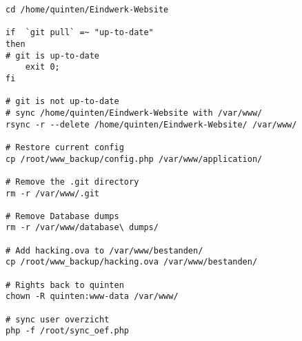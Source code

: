 \begin{lstlisting}
cd /home/quinten/Eindwerk-Website
    
if  `git pull` =~ "up-to-date" 
then
# git is up-to-date
	exit 0;
fi
    
# git is not up-to-date
# sync /home/quinten/Eindwerk-Website with /var/www/
rsync -r --delete /home/quinten/Eindwerk-Website/ /var/www/
    
# Restore current config
cp /root/www_backup/config.php /var/www/application/
    
# Remove the .git directory
rm -r /var/www/.git
    
# Remove Database dumps
rm -r /var/www/database\ dumps/
    
# Add hacking.ova to /var/www/bestanden/
cp /root/www_backup/hacking.ova /var/www/bestanden/
    
# Rights back to quinten
chown -R quinten:www-data /var/www/
    
# sync user overzicht
php -f /root/sync_oef.php
\end{lstlisting}

